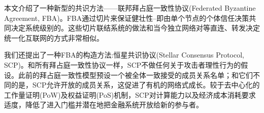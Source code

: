 \abstract{}
本文介绍了一种新型的共识方法——联邦拜占庭一致性协议(Federated Byzantine Agreement, FBA)。FBA通过{\quorum}切片来保证健壮性--即由单个节点的个体信任决策共同决定系统级别的{\quorum}。这些切片联结系统的做法和当今独立网络对等直连、转发决定统一化互联网的方式非常相似。

我们还提出了一种FBA的构造方法:恒星共识协议(Stellar Consensus Protocol, SCP)。和所有拜占庭一致性协议一样，SCP不做任何关于攻击者理性行为的假设。此前的拜占庭一致性模型预设一个被全体一致接受的成员关系名单；和它们不同的是，SCP允许开放的成员关系，这促进了有机的网络式成长。较于去中心化的工作量证明(PoW)及权益证明(PoS)机制，SCP对计算能力以及经济成本消耗要求适度，降低了进入门槛并潜在地把金融系统开放给新的参与者。